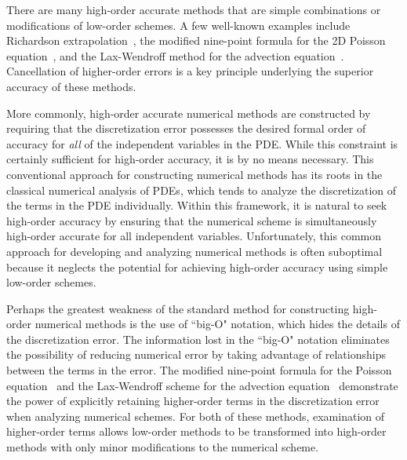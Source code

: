 \documentclass[oneeqnum,onefignum,onetabnum,onethmnum]{siamltex}
\begin{document}
There are many high-order accurate methods that are simple combinations or 
modifications of low-order schemes.  A few well-known examples include 
Richardson extrapolation~\cite{richardson_1927, heath_book}, the modified 
nine-point formula for the 2D Poisson equation~\cite{iserles_book}, and the 
Lax-Wendroff method for the advection equation~\cite{leveque_book_1992, 
leveque_book_2002, gko_book}.  Cancellation of higher-order errors is a key 
principle underlying the superior accuracy of these methods.

More commonly, high-order accurate numerical methods are constructed by 
requiring that the discretization error possesses the desired formal order of 
accuracy for \emph{all} of the independent variables in the PDE.  While this 
constraint is certainly sufficient for high-order accuracy, it is by no means 
necessary.  This conventional approach for constructing numerical methods 
has its roots in the classical numerical analysis of PDEs, which tends to 
analyze the discretization of the terms in the PDE individually.  Within this 
framework, it is natural to seek high-order accuracy by ensuring that the 
numerical scheme is simultaneously high-order accurate for all independent 
variables.  Unfortunately, this common approach for developing and analyzing 
numerical methods is often suboptimal because it neglects the potential for 
achieving high-order accuracy using simple low-order schemes.

Perhaps the greatest weakness of the standard method for constructing 
high-order numerical methods is the use of ``big-O" notation, which hides 
the details of the discretization error.  The information lost in the 
``big-O" notation eliminates the possibility of reducing numerical error by 
taking advantage of relationships between the terms in the error.  The 
modified nine-point formula for the Poisson equation~\cite{iserles_book} 
and the Lax-Wendroff scheme for the advection equation~\cite{leveque_book_1992,
leveque_book_2002, gko_book} demonstrate the power of explicitly retaining 
higher-order terms in the discretization error when analyzing numerical 
schemes.  For both of these methods, examination of higher-order terms allows 
low-order methods to be transformed into high-order methods with only minor 
modifications to the numerical scheme.  
\end{document}
